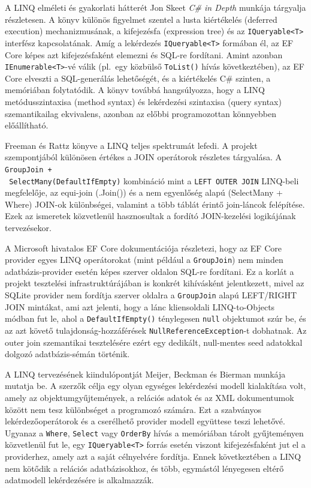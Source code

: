 A LINQ elméleti és gyakorlati hátterét Jon Skeet \textit{C\# in Depth} \cite{skeet2019csharp} munkája tárgyalja részletesen. A könyv különös figyelmet szentel a lusta kiértékelés (deferred execution) mechanizmusának, a kifejezésfa (expression tree) és az \texttt{IQueryable<T>} interfész kapcsolatának. Amíg a lekérdezés \texttt{IQueryable<T>} formában él, az EF Core képes azt kifejezésfaként elemezni és SQL-re fordítani. Amint azonban \texttt{IEnumerable<T>}-vé válik (pl.\ egy közbülső \texttt{ToList()} hívás következtében), az EF Core elveszti a SQL-generálás lehetőségét, és a kiértékelés C\# szinten, a memóriában folytatódik. A könyv továbbá hangsúlyozza, hogy a LINQ metódusszintaxisa (method syntax) és lekérdezési szintaxisa (query syntax) szemantikailag ekvivalens, azonban az előbbi programozottan könnyebben előállítható.

Freeman és Rattz \cite{freeman2010prolinq} könyve a LINQ teljes spektrumát lefedi. A projekt szempontjából különösen értékes a JOIN operátorok részletes tárgyalása. A \texttt{GroupJoin +} \\ \texttt{ SelectMany(DefaultIfEmpty)} kombináció mint a \texttt{LEFT OUTER JOIN} LINQ-beli megfelelője, az equi-join (.Join()) és a nem egyenlőség alapú (SelectMany + Where) JOIN-ok különbségei, valamint a több táblát érintő join-láncok felépítése. Ezek az ismeretek közvetlenül hasznosultak a fordító JOIN-kezelési logikájának tervezésekor.

A Microsoft hivatalos EF Core dokumentációja \cite{mslearn2023efcore} részletezi, hogy az EF Core provider egyes LINQ operátorokat (mint például a \texttt{GroupJoin}) nem minden adatbázis-provider esetén képes szerver oldalon SQL-re fordítani. Ez a korlát a projekt tesztelési infrastruktúrájában is konkrét kihívásként jelentkezett, mivel az SQLite provider nem fordítja szerver oldalra a \texttt{GroupJoin} alapú LEFT/RIGHT JOIN mintákat, ami azt jelenti, hogy a lánc kliensoldali LINQ-to-Objects módban fut le, ahol a \texttt{DefaultIfEmpty()} ténylegesen \texttt{null} objektumot szúr be, és az azt követő tulajdonság-hozzáférések \texttt{NullReferenceException}-t dobhatnak. Az outer join szemantikai tesztelésére ezért egy dedikált, null-mentes seed adatokkal dolgozó adatbázis-sémán történik.


A LINQ tervezésének kiindulópontját Meijer, Beckman és Bierman \cite{meijer2006linq} munkája mutatja be. A szerzők célja egy olyan egységes lekérdezési modell kialakítása volt, amely az objektumgyűjtemények, a relációs adatok és az XML dokumentumok között nem tesz különbséget a programozó számára. Ezt a szabványos lekérdezőoperátorok és a cserélhető provider modell együttese teszi lehetővé. Ugyanaz a \texttt{Where}, \texttt{Select} vagy \texttt{OrderBy} hívás a memóriában tárolt gyűjteményen közvetlenül fut le, egy \texttt{IQueryable<T>} forrás esetén viszont kifejezésfaként jut el a providerhez, amely azt a saját célnyelvére fordítja. Ennek következtében a LINQ nem kötődik a relációs adatbázisokhoz, és több, egymástól lényegesen eltérő adatmodell lekérdezésére is alkalmazzák.

